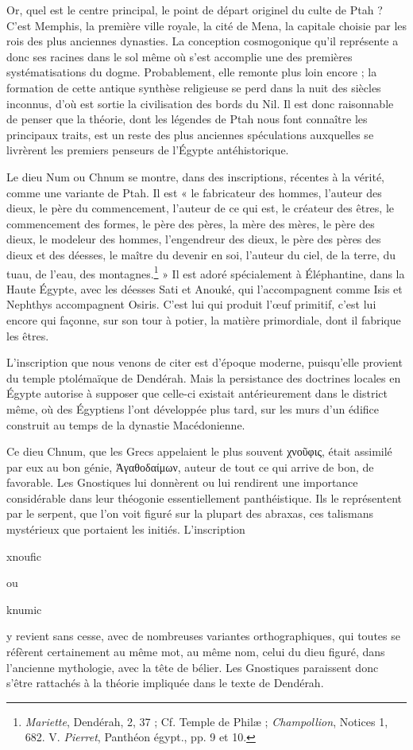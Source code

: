 \documentclass[a4paper, 11pt, oneside]{article}
\begin{document}
Or, quel est le centre principal, le point de départ originel du culte de Ptah ? C'est Memphis, la première ville royale, la cité de Mena, la capitale choisie par les rois des plus anciennes dynasties. La conception cosmogonique qu'il représente a donc ses racines dans le sol même où s'est accomplie une des premières systématisations du dogme. Probablement, elle remonte plus loin encore ; la formation de cette antique synthèse religieuse se perd dans la nuit des siècles inconnus, d'où est sortie la civilisation des bords du Nil. Il est donc raisonnable de penser que la théorie, dont les légendes de Ptah nous font connaître les principaux traits, est un reste des plus anciennes spéculations auxquelles se livrèrent les premiers penseurs de l'Égypte antéhistorique.

Le dieu Num ou Chnum se montre, dans des inscriptions, récentes à la vérité, comme une variante de Ptah. Il est « le fabricateur des hommes, l'auteur des dieux, le père du commencement, l'auteur de ce qui est, le créateur des êtres, le commencement des formes, le père des pères, la mère des mères, le père des dieux, le modeleur des hommes, l'engendreur des dieux, le père des pères des dieux et des déesses, le maître du devenir en soi, l'auteur du ciel, de la terre, du tuau, de l'eau, des montagnes.\footnote{\emph{Mariette}, Dendérah, 2, 37 ; Cf. Temple de Philæ ; \emph{Champollion}, Notices 1, 682. V. \emph{Pierret}, Panthéon égypt., pp. 9 et 10.} » Il est adoré spécialement à Éléphantine, dans la Haute Égypte, avec les déesses Sati et Anouké, qui l'accompagnent comme Isis et Nephthys accompagnent Osiris. C'est lui qui produit l'œuf primitif, c'est lui encore qui façonne, sur son tour à potier, la matière primordiale, dont il fabrique les êtres.

L'inscription que nous venons de citer est d'époque moderne, puisqu'elle provient du temple ptolémaïque de Dendérah. Mais la persistance des doctrines locales en Égypte autorise à supposer que celle-ci existait antérieurement dans le district même, où des Égyptiens l'ont développée plus tard, sur les murs d'un édifice construit au temps de la dynastie Macédonienne.

Ce dieu Chnum, que les Grecs appelaient le plus souvent χνοῦφις, était assimilé par eux au bon génie, Ἀγαθοδαίμων, auteur de tout ce qui arrive de bon, de favorable. Les Gnostiques lui donnèrent ou lui rendirent une importance considérable dans leur théogonie essentiellement panthéistique. Ils le représentent par le serpent, que l'on voit figuré sur la plupart des abraxas, ces talismans mystérieux que portaient les initiés. L'inscription \begin{coptic}xnoufic\end{coptic} ou \begin{coptic}knumic\end{coptic} y revient sans cesse, avec de nombreuses variantes orthographiques, qui toutes se réfèrent certainement au même mot, au même nom, celui du dieu figuré, dans l'ancienne mythologie, avec la tête de bélier. Les Gnostiques paraissent donc s'être rattachés à la théorie impliquée dans le texte de Dendérah.
\end{document}
